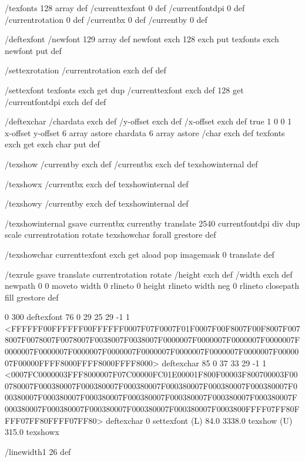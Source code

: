 
/texfonts 128 array def
/currenttexfont 0 def
/currentfontdpi 0 def
/currentrotation 0 def
/currentbx 0 def
/currentby 0 def

/deftexfont
 { /newfont 129 array def
   newfont exch 128 exch put
   texfonts exch newfont put } def

/settexrotation
 { /currentrotation exch def } def

/settexfont
 { texfonts exch get dup /currenttexfont exch def
   128 get /currentfontdpi exch def } def

/deftexchar
 { /chardata exch def
   /y-offset exch def
   /x-offset exch def
   true
   1 0 0 1 x-offset y-offset 6 array astore
   chardata
   6 array astore /char exch def
   texfonts exch get exch char put } def

/texshow
 { /currentby exch def
   /currentbx exch def
   texshowinternal } def

/texshowx
 { /currentbx exch def
   texshowinternal } def

/texshowy
 { /currentby exch def
   texshowinternal } def

/texshowinternal
 { gsave
   currentbx currentby translate
   2540 currentfontdpi div dup scale
   currentrotation rotate
   {texshowchar} forall
   grestore } def

/texshowchar
   { currenttexfont exch get aload pop imagemask 0 translate } def

/texrule
 { gsave
   translate
   currentrotation rotate
   /height exch def
   /width exch def
   newpath
    0 0 moveto
    width 0 rlineto
    0 height rlineto
    width neg 0 rlineto
    closepath
    fill
   grestore } def

0 300 deftexfont
76 0 29 25 29 -1 1 {{<FFFFFF00FFFFFF00FFFFFF0007F07F0007F01F0007F00F8007F00F8007F0078007F0078007F0078007F0038007F0038007F0000007F0000007F0000007F0000007F0000007F0000007F0000007F0000007F0000007F0000007F0000007F0000007F0000007F00000FFFF8000FFFF8000FFFF8000>}} deftexchar
85 0 37 33 29 -1 1 {{<0007FC0000003FFF8000007F07C00000FC01E00001F800F00003F800700003F000780007F000380007F000380007F000380007F000380007F000380007F000380007F000380007F000380007F000380007F000380007F000380007F000380007F000380007F000380007F000380007F000380007F000380007F000380007F0003800FFFF07FF80FFFF07FF80FFFF07FF80>}} deftexchar
0 settexfont
(L) 84.0 3338.0 texshow
(U) 315.0 texshowx



/linewidth1 26 def

